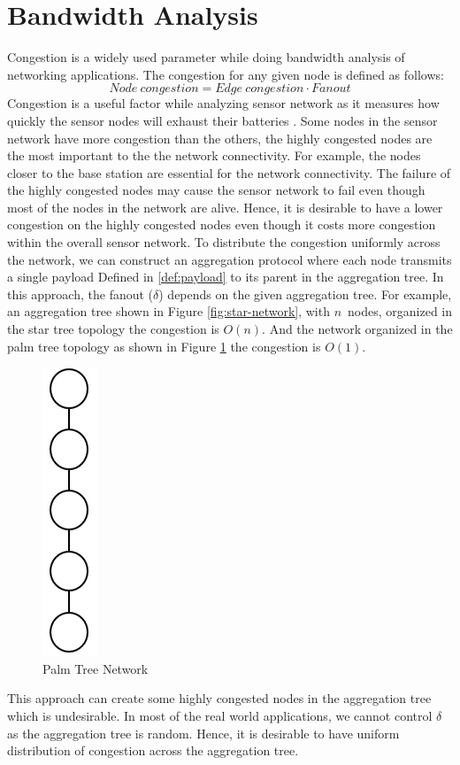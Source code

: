 \section{Bandwidth Analysis}
	Congestion is a widely used parameter while doing bandwidth analysis of networking applications.
	The congestion for any given node is defined as follows:
	\begin{equation}\label{def:congestion}
		Node\ congestion = Edge\ congestion \cdot Fanout
	\end{equation}
	Congestion is a useful factor while analyzing sensor network as it measures how quickly the sensor nodes will exhaust their batteries \cite{madden2003design}. 
	Some nodes in the sensor network have more congestion than the others, the highly congested nodes are the most important to the the network connectivity.
	For example, the nodes closer to the base station are essential for the network connectivity.
	The failure of the highly congested nodes may cause the sensor network to fail even though most of the nodes in the network are alive.
	Hence, it is desirable to have a lower congestion on the highly congested nodes even though it costs more congestion within the overall sensor network.
	To distribute the congestion uniformly across the network, we can construct an aggregation protocol where each node transmits a single payload Defined in \ref{def:payload} to its parent in the aggregation tree.
	In this approach, the fanout ($\delta$) depends on the given aggregation tree.
	For example, an aggregation tree shown in Figure \ref{fig:star-network}, with $n$\ nodes, organized in the star tree topology the congestion is $O(n)$.
	And the network organized in the palm tree topology as shown in Figure \ref{fig:palm-tree-network} the congestion is $O(1)$.
	\begin{figure}[h!]
		\centering
		\includegraphics[scale = 1]{images/palm-tree.png}
		\caption{Palm Tree Network}
		\label{fig:palm-tree-network}
	\end{figure}
	This approach can create some highly congested nodes in the aggregation tree which is undesirable.
	In most of the real world applications, we cannot control $\delta$ as the aggregation tree is random.
	Hence, it is desirable to have uniform distribution of congestion across the aggregation tree.

